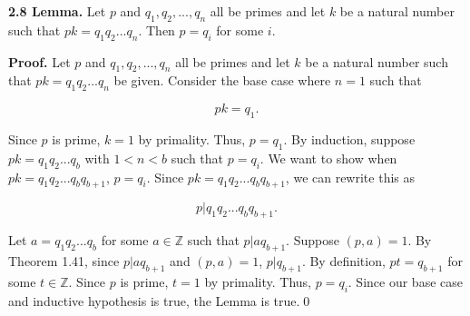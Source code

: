 \documentclass[12pt]{article}
\begin{document}
\noindent\textbf{2.8 Lemma.} Let $p$ and $q_{1},q_{2},...,q_{n}$ all be primes and let $k$ be a natural number such that $pk=q_{1}q_{2}...q_{n}$. Then $p=q_{i}$ for some $i$.

\bigskip

\noindent\textbf{Proof.} Let $p$ and $q_{1},q_{2},...,q_{n}$ all be primes and let $k$ be a natural number such that $pk=q_{1}q_{2}...q_{n}$ be given. Consider the base case where $n=1$ such that

\begin{equation*}
pk=q_{1}.
\end{equation*}

\noindent Since $p$ is prime, $k=1$ by primality. Thus, $p=q_{1}$. By induction, suppose $pk=q_{1}q_{2}...q_{b}$ with $1<n<b$ such that $p=q_{i}$. We want to show when $pk=q_{1}q_{2}...q_{b}q_{b+1}$, $p=q_{i}$. Since $pk=q_{1}q_{2}...q_{b}q_{b+1}$, we can rewrite this as 

\begin{equation*}
p|q_{1}q_{2}...q_{b}q_{b+1}.
\end{equation*}

\noindent Let $a=q_{1}q_{2}...q_{b}$ for some $a\in\mathbb{Z}$ such that $p|aq_{b+1}$. Suppose $(p,a)=1$. By Theorem 1.41, since $p|aq_{b+1}$ and $(p,a)=1$, $p|q_{b+1}$. By definition, $pt=q_{b+1}$ for some $t\in\mathbb{Z}$. Since $p$ is prime, $t=1$ by primality. Thus, $p=q_{i}$. Since our base case and inductive hypothesis is true, the Lemma is true.\qed
\end{document}
